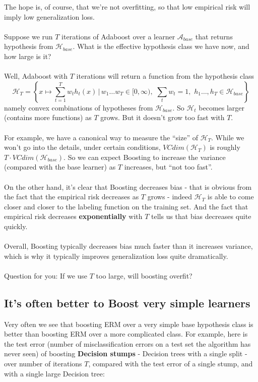 \documentclass[11pt]{article}
\newcommand{\Ac}{\mathcal{A}}
\newcommand{\Hc}{\mathcal{H}}
\begin{document}
The hope is, of course, that we're not overfitting, so that low empirical risk
will imply low generalization loss. 
\\~\\
Suppose we run $T$ iterations of Adaboost 
over a learner $\Ac_{base}$ that returns hypothesis from $\Hc_{base}$. 
What is the effective hypothesis class we have now, and how large is it?
\\~\\
Well, Adaboost with $T$ iterations will return a function from the hypothesis class  
\[
  \Hc_T = \left\{ x\mapsto \sum_{t=1}^Tw_t h_t(x) \,
  \Bigg| \,
w_1\ldots w_T\in[0,\infty),\,\, \sum_t w_t=1,\,\,
h_1\ldots,h_T\in\Hc_{base}\right\}
\]
namely convex combinations of hypotheses from $\Hc_{base}$.
So $\Hc_t$ becomes larger (contains more functions) as $T$ grows. But it 
doesn't grow too fast with $T$. 
\\~\\
For example, we have a canonical way to measure the ``size'' of $\Hc_T$.
While we won't go into the details, under certain conditions,
$VCdim(\Hc_T)$ is roughly $T\cdot VCdim(\Hc_{base})$. 
So we can expect Boosting to increase the variance (compared with the base
learner) as $T$ increases, but ``not too fast''. 
\\~\\
On the other hand, it's clear that Boosting decreases bias - that is obvious
from the fact that the empirical risk decreases as $T$ grows - indeed 
$\Hc_T$ is able to come closer and closer to the labeling function on the
training set. And the fact that empirical risk decreases {\bf exponentially} with 
$T$ tells us that bias decreases quite quickly.
\\~\\
Overall, Boosting typically decreases bias much faster than it increases
variance, which is why it typically improves generalization loss quite
dramatically.
\\~\\
Question for you: If we use $T$ too large, will boosting overfit? 


\subsection{It's often better to Boost very simple learners}
Very often we see that boosting ERM over 
a very simple base hypothesis class is better than boosting ERM over a
more complicated class. 
For example, here is the test error (number of misclassification errors on a test set
the algorithm has never seen) of boosting {\bf
Decision stumps} - Decision trees with a single split - over number of
iterations $T$, compared with the test error of a single stump, and with a
single large Decision tree:
\end{document}
